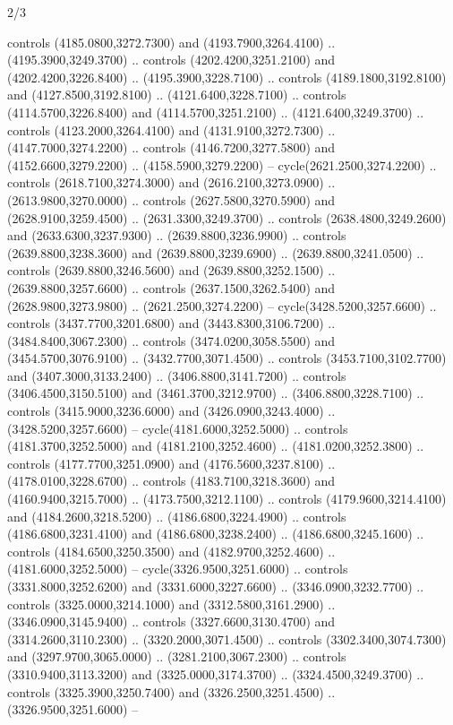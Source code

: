 \begin{flagdescription}{2/3}
\begin{scope}[shift={(0.5\flaglength,0.5)},scale=\flagwidth/130]
\begin{scope}[y=0.01mm, x=0.01mm,shift={(-3365,-2250)}]
  controls (4185.0800,3272.7300) and (4193.7900,3264.4100) ..
  (4195.3900,3249.3700) .. controls (4202.4200,3251.2100) and
  (4202.4200,3226.8400) .. (4195.3900,3228.7100) .. controls
  (4189.1800,3192.8100) and (4127.8500,3192.8100) .. (4121.6400,3228.7100) ..
  controls (4114.5700,3226.8400) and (4114.5700,3251.2100) ..
  (4121.6400,3249.3700) .. controls (4123.2000,3264.4100) and
  (4131.9100,3272.7300) .. (4147.7000,3274.2200) .. controls
  (4146.7200,3277.5800) and (4152.6600,3279.2200) .. (4158.5900,3279.2200) --
  cycle(2621.2500,3274.2200) .. controls (2618.7100,3274.3000) and
  (2616.2100,3273.0900) .. (2613.9800,3270.0000) .. controls
  (2627.5800,3270.5900) and (2628.9100,3259.4500) .. (2631.3300,3249.3700) ..
  controls (2638.4800,3249.2600) and (2633.6300,3237.9300) ..
  (2639.8800,3236.9900) .. controls (2639.8800,3238.3600) and
  (2639.8800,3239.6900) .. (2639.8800,3241.0500) .. controls
  (2639.8800,3246.5600) and (2639.8800,3252.1500) .. (2639.8800,3257.6600) ..
  controls (2637.1500,3262.5400) and (2628.9800,3273.9800) ..
  (2621.2500,3274.2200) -- cycle(3428.5200,3257.6600) .. controls
  (3437.7700,3201.6800) and (3443.8300,3106.7200) .. (3484.8400,3067.2300) ..
  controls (3474.0200,3058.5500) and (3454.5700,3076.9100) ..
  (3432.7700,3071.4500) .. controls (3453.7100,3102.7700) and
  (3407.3000,3133.2400) .. (3406.8800,3141.7200) .. controls
  (3406.4500,3150.5100) and (3461.3700,3212.9700) .. (3406.8800,3228.7100) ..
  controls (3415.9000,3236.6000) and (3426.0900,3243.4000) ..
  (3428.5200,3257.6600) -- cycle(4181.6000,3252.5000) .. controls
  (4181.3700,3252.5000) and (4181.2100,3252.4600) .. (4181.0200,3252.3800) ..
  controls (4177.7700,3251.0900) and (4176.5600,3237.8100) ..
  (4178.0100,3228.6700) .. controls (4183.7100,3218.3600) and
  (4160.9400,3215.7000) .. (4173.7500,3212.1100) .. controls
  (4179.9600,3214.4100) and (4184.2600,3218.5200) .. (4186.6800,3224.4900) ..
  controls (4186.6800,3231.4100) and (4186.6800,3238.2400) ..
  (4186.6800,3245.1600) .. controls (4184.6500,3250.3500) and
  (4182.9700,3252.4600) .. (4181.6000,3252.5000) -- cycle(3326.9500,3251.6000)
  .. controls (3331.8000,3252.6200) and (3331.6000,3227.6600) ..
  (3346.0900,3232.7700) .. controls (3325.0000,3214.1000) and
  (3312.5800,3161.2900) .. (3346.0900,3145.9400) .. controls
  (3327.6600,3130.4700) and (3314.2600,3110.2300) .. (3320.2000,3071.4500) ..
  controls (3302.3400,3074.7300) and (3297.9700,3065.0000) ..
  (3281.2100,3067.2300) .. controls (3310.9400,3113.3200) and
  (3325.0000,3174.3700) .. (3324.4500,3249.3700) .. controls
  (3325.3900,3250.7400) and (3326.2500,3251.4500) .. (3326.9500,3251.6000) --

\end{scope}
\end{scope}
\end{flagdescription}
